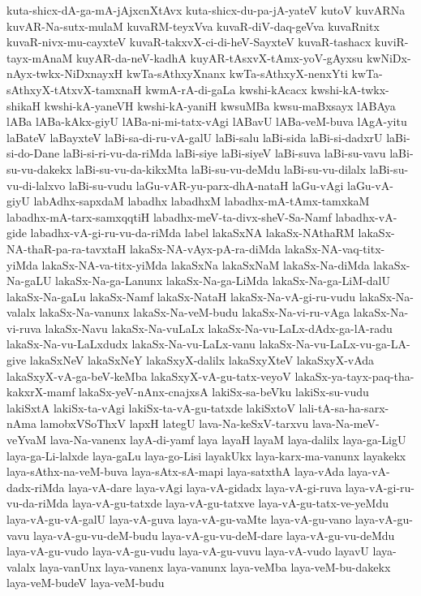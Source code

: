 {kuta-shicx-dA-ga-mA-jAjxcnXtAvx
kuta-shicx-du-pa-jA-yateV
kutoV
kuvARNa
kuvAR-Na-sutx-mulaM
kuvaRM-teyxVva
kuvaR-diV-daq-geVva
kuvaRnitx
kuvaR-nivx-mu-cayxteV
kuvaR-takxvX-ci-di-heV-SayxteV
kuvaR-tashacx
kuviR-tayx-mAnaM
kuyAR-da-neV-kadhA
kuyAR-tAsxvX-tAmx-yoV-gAyxsu
kwNiDx-nAyx-twkx-NiDxnayxH
kwTa-sAthxyXnanx
kwTa-sAthxyX-nenxYti
kwTa-sAthxyX-tAtxvX-tamxnaH
kwmA-rA-di-gaLa
kwshi-kAcacx
kwshi-kA-twkx-shikaH
kwshi-kA-yaneVH
kwshi-kA-yaniH
kwsuMBa
kwsu-maBxsayx
lABAya
lABa
lABa-kAkx-giyU
lABa-ni-mi-tatx-vAgi
lABavU
lABa-veM-buva
lAgA-yitu
laBateV
laBayxteV
laBi-sa-di-ru-vA-galU
laBi-salu
laBi-sida
laBi-si-dadxrU
laBi-si-do-Dane
laBi-si-ri-vu-da-riMda
laBi-siye
laBi-siyeV
laBi-suva
laBi-su-vavu
laBi-su-vu-dakekx
laBi-su-vu-da-kikxMta
laBi-su-vu-deMdu
laBi-su-vu-dilalx
laBi-su-vu-di-lalxvo
laBi-su-vudu
laGu-vAR-yu-parx-dhA-nataH
laGu-vAgi
laGu-vA-giyU
labAdhx-sapxdaM
labadhx
labadhxM
labadhx-mA-tAmx-tamxkaM
labadhx-mA-tarx-samxqqtiH
labadhx-meV-ta-divx-sheV-Sa-Namf
labadhx-vA-gide
labadhx-vA-gi-ru-vu-da-riMda
label
lakaSxNA
lakaSx-NAthaRM
lakaSx-NA-thaR-pa-ra-tavxtaH
lakaSx-NA-vAyx-pA-ra-diMda
lakaSx-NA-vaq-titx-yiMda
lakaSx-NA-va-titx-yiMda
lakaSxNa
lakaSxNaM
lakaSx-Na-diMda
lakaSx-Na-gaLU
lakaSx-Na-ga-Lanunx
lakaSx-Na-ga-LiMda
lakaSx-Na-ga-LiM-dalU
lakaSx-Na-gaLu
lakaSx-Namf
lakaSx-NataH
lakaSx-Na-vA-gi-ru-vudu
lakaSx-Na-valalx
lakaSx-Na-vanunx
lakaSx-Na-veM-budu
lakaSx-Na-vi-ru-vAga
lakaSx-Na-vi-ruva
lakaSx-Navu
lakaSx-Na-vuLaLx
lakaSx-Na-vu-LaLx-dAdx-ga-lA-radu
lakaSx-Na-vu-LaLxdudx
lakaSx-Na-vu-LaLx-vanu
lakaSx-Na-vu-LaLx-vu-ga-LA-give
lakaSxNeV
lakaSxNeY
lakaSxyX-dalilx
lakaSxyXteV
lakaSxyX-vAda
lakaSxyX-vA-ga-beV-keMba
lakaSxyX-vA-gu-tatx-veyoV
lakaSx-ya-tayx-paq-tha-kakxrX-mamf
lakaSx-yeV-nAnx-cnajxsA
lakiSx-sa-beVku
lakiSx-su-vudu
lakiSxtA
lakiSx-ta-vAgi
lakiSx-ta-vA-gu-tatxde
lakiSxtoV
lali-tA-sa-ha-sarx-nAma
lamobxVSoThxV
lapxH
lategU
lava-Na-keSxV-tarxvu
lava-Na-meV-veYvaM
lava-Na-vanenx
layA-di-yamf
laya
layaH
layaM
laya-dalilx
laya-ga-LigU
laya-ga-Li-lalxde
laya-gaLu
laya-go-Lisi
layakUkx
laya-karx-ma-vanunx
layakekx
laya-sAthx-na-veM-buva
laya-sAtx-sA-mapi
laya-satxthA
laya-vAda
laya-vA-dadx-riMda
laya-vA-dare
laya-vAgi
laya-vA-gidadx
laya-vA-gi-ruva
laya-vA-gi-ru-vu-da-riMda
laya-vA-gu-tatxde
laya-vA-gu-tatxve
laya-vA-gu-tatx-ve-yeMdu
laya-vA-gu-vA-galU
laya-vA-guva
laya-vA-gu-vaMte
laya-vA-gu-vano
laya-vA-gu-vavu
laya-vA-gu-vu-deM-budu
laya-vA-gu-vu-deM-dare
laya-vA-gu-vu-deMdu
laya-vA-gu-vudo
laya-vA-gu-vudu
laya-vA-gu-vuvu
laya-vA-vudo
layavU
laya-valalx
laya-vanUnx
laya-vanenx
laya-vanunx
laya-veMba
laya-veM-bu-dakekx
laya-veM-budeV
laya-veM-budu
}
